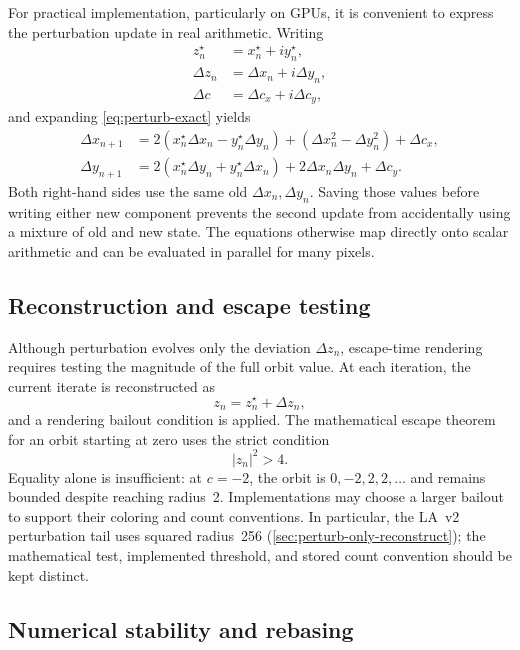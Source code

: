 For practical implementation, particularly on GPUs, it is convenient to express
the perturbation update in real arithmetic. Writing
\begin{align*}
z_n^\star &= x_n^\star + i y_n^\star, \\
\Delta z_n &= \Delta x_n + i \Delta y_n, \\
\Delta c &= \Delta c_x + i \Delta c_y,
\end{align*}
and expanding \cref{eq:perturb-exact} yields
\begin{align}
\Delta x_{n+1}
&= 2(x_n^\star \Delta x_n - y_n^\star \Delta y_n)
   + (\Delta x_n^2 - \Delta y_n^2)
   + \Delta c_x, \\
\Delta y_{n+1}
&= 2(x_n^\star \Delta y_n + y_n^\star \Delta x_n)
   + 2 \Delta x_n \Delta y_n
   + \Delta c_y.
\end{align}
Both right-hand sides use the same old $\Delta x_n,\Delta y_n$. Saving those
values before writing either new component prevents the second update from
accidentally using a mixture of old and new state. The equations otherwise map
directly onto scalar arithmetic and can be evaluated in parallel for many pixels.

\subsection{Reconstruction and escape testing}

Although perturbation evolves only the deviation \(\Delta z_n\), escape-time
rendering requires testing the magnitude of the full orbit value. At each
iteration, the current iterate is reconstructed as
\[
z_n = z_n^\star + \Delta z_n,
\]
and a rendering bailout condition is applied. The mathematical escape theorem
for an orbit starting at zero uses the strict condition
\[
|z_n|^2 > 4.
\]
Equality alone is insufficient: at $c=-2$, the orbit is $0,-2,2,2,\ldots$ and
remains bounded despite reaching radius~2. Implementations may choose a larger
bailout to support their coloring and count conventions. In particular, the
LA~v2 perturbation tail uses squared radius~256
(\cref{sec:perturb-only-reconstruct}); the mathematical test, implemented
threshold, and stored count convention should be kept distinct.

\subsection{Numerical stability and rebasing}

